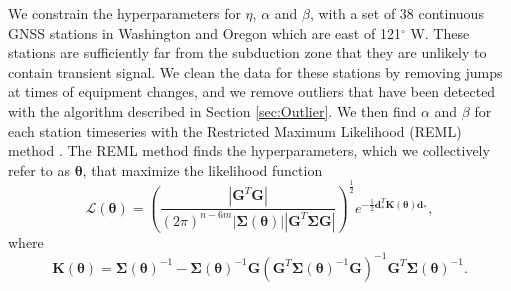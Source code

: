 \documentclass[10pt,letter]{article}
\begin{document}
We constrain the hyperparameters for $\eta$, $\alpha$ and $\beta$, with a set of 38 continuous GNSS stations in Washington and Oregon which are east of 121$^\circ$ W.  These stations are sufficiently far from the subduction zone that they are unlikely to contain transient signal.  We clean the data for these stations by removing jumps at times of equipment changes, and we remove outliers that have been detected with the algorithm described in Section \ref{sec:Outlier}. We then find $\alpha$ and $\beta$ for each station timeseries with the Restricted Maximum Likelihood (REML) method \cite[e.g.,][]{Harville1974,Cressie1992}. The REML method finds the hyperparameters, which we collectively refer to as $\bm{\theta}$, that maximize the likelihood function
\begin{equation}\label{eq:REML}
\mathcal{L}(\bm{\theta}) = \left(\frac{\left|\bm{G}^T\bm{G}\right|}
                           {(2\pi)^{n-6m} 
                           \left| \bm{\Sigma}(\bm{\theta}) \right| 
                           \left| \bm{G}^T\bm{\Sigma}\bm{G} \right|}\right)^{\frac{1}{2}} 
                           e^{-\tfrac{1}{2}\bm{d}_*^T\bm{K}(\bm{\theta})\bm{d}_*},
\end{equation}
where
\begin{equation}
\bm{K}(\bm{\theta}) = \bm{\Sigma}(\bm{\theta})^{-1} - 
                      \bm{\Sigma}(\bm{\theta})^{-1}\bm{G}
         \left(\bm{G}^T\bm{\Sigma}(\bm{\theta})^{-1}\bm{G}\right)^{-1}
         \bm{G}^T\bm{\Sigma}(\bm{\theta})^{-1}.
\end{equation}
\end{document}
